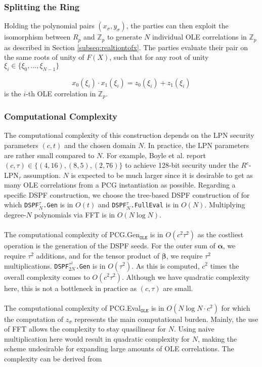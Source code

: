\subsubsection{Splitting the Ring}

Holding the polynomial pairs $(x_\sigma , y_\sigma)$, the parties can then exploit the isomorphism between $R_p$ and $\mathbb{Z}_{p}$ to generate $N$ individual OLE correlations in $\mathbb{Z}_{p}$ as described in Section \ref{subseq:realtiontofx}. The parties evaluate their pair on the same roots of unity of $F(X)$, such that for any root of unity $\xi_i \in \{\xi_0, ...,\xi_{N-1}\}$

\begin{equation}
x_0(\xi_i) \cdot x_1(\xi_i) = z_0(\xi_i)+ z_1(\xi_i)
\end{equation}
is the $i$-th OLE correlation in $\mathbb{Z}_{p}$.

\subsubsection{Computational Complexity}
The computational complexity of this construction depends on the LPN security parameters $(c, t)$ and the chosen domain $N$. In practice, the LPN parameters are rather small compared to $N$. For example, Boyle et al. \cite{boyle2020efficient} report $(c,\tau) \in \{(4,16),(8,5),(2,76)\}$ to achieve 128-bit security under the $R^c$-LPN$_\tau$ assumption. $N$ is expected to be much larger since it is desirable to get as many OLE correlations from a PCG instantiation as possible. Regarding a specific DSPF construction, we choose the tree-based DSPF construction of \cite{boyle2016function} for which \texttt{DSPF$^{\tau}_{N}$.Gen} is in $O(t)$ and \texttt{DSPF$^{\tau}_{N}$.FullEval} is in $O(N)$. Multiplying degree-$N$ polynomials via FFT is in $O(N\log N)$.
\\\\
The computational complexity of PCG.Gen$_{\texttt{OLE}}$ is in $O(c^2\tau^2)$ as the costliest operation is the generation of the DSPF seeds. For the outer sum of $\boldsymbol{\alpha}$, we require $\tau^2$ additions, and for the tensor product of $\boldsymbol{\beta}$, we require $\tau^2$ multiplications. \texttt{DSPF$^{\tau^2}_{2N}$.Gen} is in $O(\tau^2)$. As this is computed, $c^2$ times the overall complexity comes to $O(c^2\tau^2)$. Although we have quadratic complexity here, this is not a bottleneck in practice as $(c,\tau)$ are small.
\\\\
The computational complexity of PCG.Eval$_{\texttt{OLE}}$ is in $O(N\log N \cdot c^2)$ for which the computation of $z_\sigma$ represents the main computational burden. Mainly, the use of FFT allows the complexity to stay quasilinear for $N$. Using naive multiplication here would result in quadratic complexity for $N$, making the scheme undesirable for expanding large amounts of OLE correlations. The complexity can be derived from

